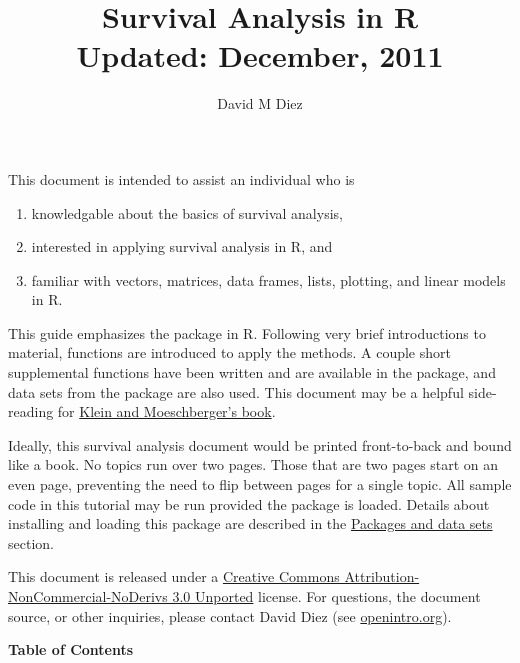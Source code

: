 \documentclass[11pt]{article}
\title{Survival Analysis in R \vspace{1mm} \\ \large{Updated: December, 2011}}
\author{%
David M Diez} %
\date{}
\begin{document}
\maketitle

This document is intended to assist an individual who is
\begin{enumerate}
\item knowledgable about the basics of survival analysis,
\item interested in applying survival analysis in R, and
\item familiar with vectors, matrices, data frames, lists, plotting, and linear models in R.
\end{enumerate}

This guide emphasizes the  package in R. Following very brief introductions to material, functions are introduced to apply the methods. A couple short supplemental functions have been written and are available in the  package, and data sets from the  package are also used. This document may be a helpful side-reading for \href{http://www.amazon.com/dp/1441929851}{Klein and Moeschberger's book}.

Ideally, this survival analysis document would be printed front-to-back and bound like a book. No topics run over two pages. Those that are two pages start on an even page, preventing the need to flip between pages for a single topic. All sample code in this tutorial may be run provided the  package is loaded. Details about installing and loading this package are described in the \hyperref[packagesAndData]{Packages and data sets} section.

This document is released under a \href{http://creativecommons.org/licenses/by-nc-nd/3.0/}{Creative Commons Attribution-NonCommercial-NoDerivs 3.0 Unported} license. For questions, the document source, or other inquiries, please contact David Diez (see \href{http://openintro.org/about.php}{openintro.org}).

\vspace{5mm}

\textbf{\large Table of Contents}
\end{document}
